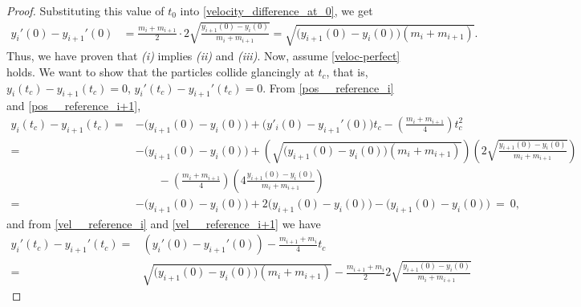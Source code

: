 \documentclass[11pt]{article}
\numberwithin{equation}{section}
\begin{document}
\begin{proof}
            Substituting this value of $t_0$ into \eqref{velocity_difference_at_0}, we get
            \begin{align*}
                y_i'(0) - y_{i+1}'(0) &= \frac{m_i + m_{i+1}}{2} \cdot 2\sqrt{\frac{y_{i+1}(0) - y_i(0)}{m_i + m_{i+1}}} = \sqrt{\big( y_{i+1}(0) - y_i(0) \big) \left(m_i + m_{i+1} \right)}.
            \end{align*}
            Thus, we have proven that \emph{(i)} implies \emph{(ii)} and \emph{(iii)}. Now, assume \eqref{veloc-perfect} holds.
            We want to show that the particles collide glancingly at $t_c$, that is, $y_i(t_c) - y_{i + 1}(t_c) = 0$, $y_i'(t_c) - y_{i + 1}'(t_c) = 0$. From \eqref{pos__reference_i} and \eqref{pos__reference_i+1}, 
            \begin{align*}
                y_i(t_c) - y_{i + 1}(t_c) 
                =& -\big( y_{i+1}(0) - y_i(0) \big) + \big( y'_i(0) - y_{i+1}'(0)\big) t_c - \left( \frac{m_i + m_{i+1}}{4} \right) t_c^2 \\
                =& -\big( y_{i+1}(0) - y_i(0) \big) + \left( \sqrt{\big( y_{i+1}(0) - y_i(0) \big) \left(m_i + m_{i+1} \right)} \right) \left( 2\sqrt{\frac{y_{i+1}(0) - y_i(0)}{m_i + m_{i+1}}} \right)  \\ 
                &\quad\quad - \left( \frac{m_i + m_{i+1}}{4} \right) \left( 4 \frac{y_{i+1}(0) - y_i(0)}{m_i + m_{i+1}} \right) \nonumber \\
                =& -\big( y_{i+1}(0) - y_i(0) \big) + 2 \big( y_{i+1}(0) - y_{i}(0) \big) - \big( y_{i+1}(0) - y_{i}(0) \big)\ = \ 0,
            \end{align*}
            and from \eqref{vel__reference_i} and \eqref{vel__reference_i+1} we have
            \begin{align*}
                y_i'(t_c) - y_{i + 1}'(t_c) 
                =& \left( y_i'(0) - y_{i+1}'(0) \right) - \frac{m_{i+1} + m_i}{4} t_c \\
                =& \sqrt{\big( y_{i+1}(0) - y_i(0) \big) \left(m_i + m_{i+1} \right)} - \frac{m_{i+1} + m_i}{2} 2\sqrt{\frac{y_{i+1}(0) - y_i(0)}{m_i + m_{i+1}}} 

\end{align*}
\end{proof}
\end{document}
